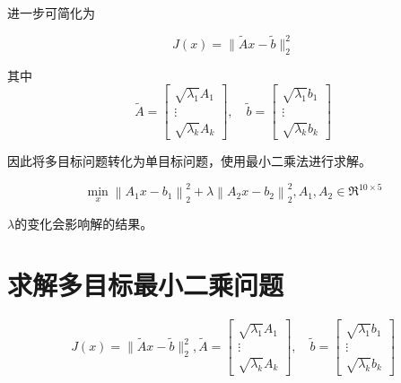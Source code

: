进一步可简化为

\begin{problem}[加权最小二乘法问题矩阵形式]

    \begin{equation} J(x)=\|\tilde{A} x-\tilde{b}\|_{2}^{2} \end{equation}

其中
\begin{equation}
\tilde{A}=\left[\begin{array}{c}
\sqrt{\lambda_{1}} A_{1} \\
\vdots \\
\sqrt{\lambda_{k}} A_{k}
\end{array}\right], \quad \tilde{b}=\left[\begin{array}{c}
\sqrt{\lambda_{1}} b_{1} \\
\vdots \\
\sqrt{\lambda_{k}} b_{k}
\end{array}\right]
\end{equation}
\end{problem}


因此将多目标问题转化为单目标问题，使用最小二乘法进行求解。

\begin{problem}[双目标规划问题]
    \begin{equation} \min _{x}\left\|A_{1} x-b_{1}\right\|_{2}^{2}+\lambda\left\|A_{2} x-b_{2}\right\|_{2}^{2}, A_{1}, A_{2} \in \mathfrak{R}^{10 \times 5} \end{equation}

    $\lambda$的变化会影响解的结果。
\end{problem}


\section{求解多目标最小二乘问题}

\begin{problem}
    \begin{equation}
    J(x)=\|\tilde{A} x-\tilde{b}\|_{2}^{2},
\tilde{A}=\left[\begin{array}{c}
\sqrt{\lambda_{1}} A_{1} \\
\vdots \\
\sqrt{\lambda_{k}} A_{k}
\end{array}\right], \quad \tilde{b}=\left[\begin{array}{c}
\sqrt{\lambda_{1}} b_{1} \\
\vdots \\
\sqrt{\lambda_{k}} b_{k}
\end{array}\right]
\end{equation}

\end{problem}


